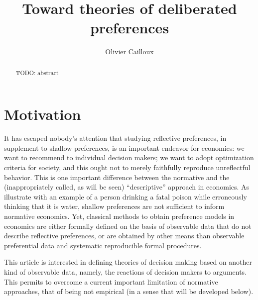\documentclass[version=last, pagesize, twoside=off, bibliography=totoc, DIV=calc, fontsize=12pt, a4paper, french, english]{scrartcl}
\begin{document}
\title{Toward theories of deliberated preferences}
\author{Olivier Cailloux}
\makeatletter
\makeatother
\maketitle

\begin{abstract}
	TODO: abstract
\end{abstract}

\section{Motivation} 

It has escaped nobody’s attention that 
studying reflective preferences, in supplement to shallow preferences, is an important endeavor for economics: we want to recommend to individual decision makers; we want to adopt optimization criteria for society, and this ought not to merely faithfully reproduce unreflectful behavior. This is one important difference between the normative and the (inappropriately called, as will be seen) “descriptive” approach in economics. As \citet{hausman_preference_1994} illustrate with an example of a person drinking a fatal poison while erroneously thinking that it is water, shallow preferences are not sufficient to inform normative economics.
Yet, classical methods to obtain preference models in economics are either formally defined on the basis of observable data that do not describe reflective preferences, or are obtained by other means than observable preferential data and systematic reproducible formal procedures. 

This article is interested in defining theories of decision making based on another kind of observable data, namely, the reactions of decision makers to arguments. This permits to overcome a current important limitation of normative approaches, that of being not empirical (in a sense that will be developed below).
\end{document}
